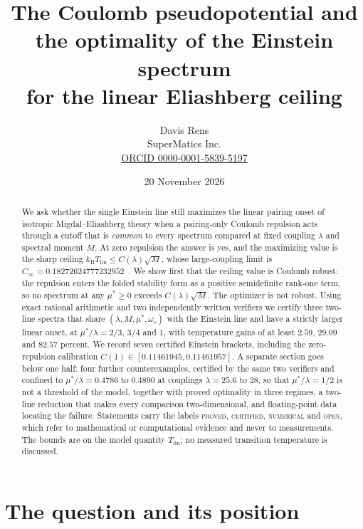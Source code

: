 \documentclass[11pt]{article}
\title{The Coulomb pseudopotential and the optimality of the Einstein spectrum\\ for the linear Eliashberg ceiling}
\author{Davis Rens\\SuperMatics Inc.\\\href{https://orcid.org/0000-0001-5839-5197}{ORCID 0000-0001-5839-5197}}
\date{20 November 2026}
\newcommand{\kb}{k_{\mathrm B}}
\newcommand{\Tlin}{T_{\mathrm{lin}}}
\newcommand{\muS}{\mu^{*}}
\theoremstyle{definition}
\theoremstyle{remark}
\begin{document}
\maketitle

\begin{abstract}
We ask whether the single Einstein line still maximizes the linear pairing onset of
isotropic Migdal--Eliashberg theory when a pairing-only Coulomb repulsion acts through a
cutoff that is \emph{common} to every spectrum compared at fixed coupling $\lambda$ and
spectral moment $M$. At zero repulsion the answer is yes, and the maximizing value is the
sharp ceiling $\kb\Tlin\le C(\lambda)\sqrt M$, whose large-coupling limit is
$C_\infty=0.18272624777232952$~\cite{univglue,anisosharp}. We show first that the ceiling value is Coulomb robust:
the repulsion enters the folded stability form as a positive semidefinite rank-one term,
so no spectrum at any $\muS\ge0$ exceeds $C(\lambda)\sqrt M$. The optimizer is not robust.
Using exact rational arithmetic and two independently written verifiers we certify three
two-line spectra that share $(\lambda,M,\muS,\omega_c)$ with the Einstein line and have a
strictly larger linear onset, at $\muS/\lambda=2/3$, $3/4$ and $1$, with temperature
gains of at least $2.59$, $29.09$ and $82.57$ percent. We record seven certified Einstein
brackets, including the zero-repulsion calibration
$C(1)\in[0.11461945,0.11461957]$. A separate section goes below one half: four further
counterexamples, certified by the same two verifiers and confined to $\muS/\lambda=0.4786$
to $0.4890$ at couplings $\lambda=25.6$ to $28$, so that $\muS/\lambda=1/2$ is not a
threshold of the model, together with proved optimality in three regimes, a two-line
reduction that makes every comparison two-dimensional, and floating-point data locating the
failure. Statements carry the labels
\textsc{proved}, \textsc{certified}, \textsc{numerical} and \textsc{open}, which refer to
mathematical or computational evidence and never to measurements. The bounds are on the
model quantity $\Tlin$; no measured transition temperature is discussed.
\end{abstract}

\section{The question and its position}
\end{document}
